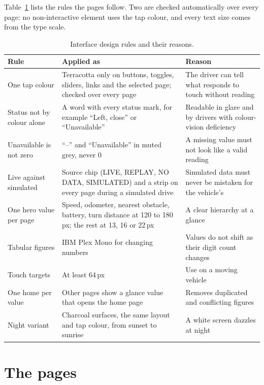 Table~\ref{tab:ui-rules} lists the rules the pages follow. Two are checked automatically over every page: no non-interactive element uses the tap colour, and every text size comes from the type scale.

\begin{table}[htbp]
\centering
\caption[Interface design rules and their reasons]{Interface design rules and their reasons.}
\label{tab:ui-rules}
\small
\begin{tabular}{|p{3.6cm}|p{5.6cm}|p{5.2cm}|}
\hline
\textbf{Rule} & \textbf{Applied as} & \textbf{Reason} \\ \hline
One tap colour & Terracotta only on buttons, toggles, sliders, links and the selected page; checked over every page & The driver can tell what responds to touch without reading \\ \hline
Status not by colour alone & A word with every status mark, for example ``Left, close'' or ``Unavailable'' & Readable in glare and by drivers with colour-vision deficiency \\ \hline
Unavailable is not zero & ``--'' and ``Unavailable'' in muted grey, never 0 & A missing value must not look like a valid reading \\ \hline
Live against simulated & Source chip (LIVE, REPLAY, NO DATA, SIMULATED) and a strip on every page during a simulated drive & Simulated data must never be mistaken for the vehicle's \\ \hline
One hero value per page & Speed, odometer, nearest obstacle, battery, turn distance at 120 to 180\,px; the rest at 13, 16 or 22\,px & A clear hierarchy at a glance \\ \hline
Tabular figures & IBM Plex Mono for changing numbers & Values do not shift as their digit count changes \\ \hline
Touch targets & At least 64\,px & Use on a moving vehicle \\ \hline
One home per value & Other pages show a glance value that opens the home page & Removes duplicated and conflicting figures \\ \hline
Night variant & Charcoal surfaces, the same layout and tap colour, from sunset to sunrise & A white screen dazzles at night \\ \hline
\end{tabular}
\end{table}

\section{The pages}


